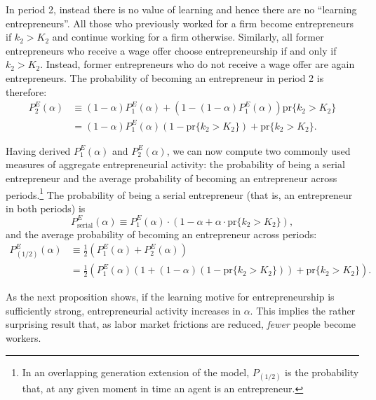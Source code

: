 \documentclass[12pt,american]{paper}
\theoremstyle{remark}
\begin{document}
In period 2, instead there is no value of learning and hence there are no ``learning entrepreneurs''. All those who previously worked for a firm become entrepreneurs if $k_2>K_2$ and continue working for a firm otherwise. Similarly, all former entrepreneurs who receive a wage offer choose entrepreneurship if and only if $k_2>K_2$. Instead, former entrepreneurs who do not receive a wage offer are again entrepreneurs. The probability of becoming an entrepreneur in period 2 is therefore:
\begin{align*}
P_2^E(\alpha)&\equiv (1-\alpha)P_1^E(\alpha)+(1-(1-\alpha)P_1^E(\alpha))\mbox{pr}\{k_2>K_2\}\\
&=(1-\alpha )P_1^E(\alpha)(1-\mbox{pr}\{k_2>K_2\})+\mbox{pr}\{k_2>K_2\}.
\end{align*}

Having derived $P_1^E(\alpha)$ and $P_2^E(\alpha)$, we can now compute two commonly used measures of aggregate entrepreneurial activity: the probability of being a serial entrepreneur and the average probability of becoming an entrepreneur across periods.\footnote{In an overlapping generation extension of the model, $P_{(1/2)}$ is the probability that, at any given moment in time an agent is an entrepreneur.}
The probability of being a serial entrepreneur (that is, an entrepreneur in both periods) is
$$
P_{\mbox{serial}}^E(\alpha)\equiv P_1^E(\alpha) \cdot (1-\alpha +  \alpha \cdot \mbox{pr}\{k_2>K_2\}),
$$
and the average probability of becoming an entrepreneur across periods:
\begin{align*}
P_{(1/2)}^E(\alpha)&\equiv \frac{1}{2} \left( P_1^E(\alpha) + P_2^E(\alpha) \right)\\
&= \frac{1}{2} \left( P_1^E(\alpha)(1+(1-\alpha)(1-\mbox{pr}\{k_2>K_2\})) +\mbox{pr}\{k_2>K_2\}  \right). 
\end{align*} 

As the next proposition shows, if the learning motive for entrepreneurship is sufficiently strong, entrepreneurial activity increases in $\alpha$. This implies the rather surprising result that, as labor market frictions are reduced, \emph{fewer} people become workers.

\end{document}
